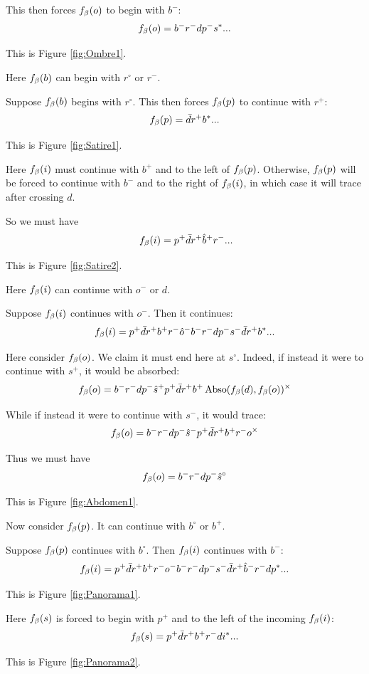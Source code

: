 This then forces $f_\beta(o)$ to begin with $b^-$:
\[
f_\beta(o) = b^- r^- d p^- s^*...
\]

This is Figure \ref{fig:Ombre1}.

Here $f_\beta(b)$ can begin with $r^\circ$ or $r^-$. 

 \label{Satire}
Suppose $f_\beta(b)$ begins with $r^\circ$. This then forces $f_\beta(p)$ to continue with $r^+$:
\[
f_\beta(p) = \bar{d} r^+ b^*...
\]

This is Figure \ref{fig:Satire1}.

Here $f_\beta(i)$ must continue with $b^+$ and to the left of $f_\beta(p)$. Otherwise, $f_\beta(p)$ will be forced to continue with $b^-$ and to the right of $f_\beta(i)$, in which case it will trace after crossing $d$.

So we must have
\[
\
f_\beta(i) = p^+ \bar{d} r^+ \hat{b}^+ r^-...
\]

This is Figure \ref{fig:Satire2}.

Here $f_\beta(i)$ can continue with $o^-$ or $d$.

 \label{Abdomen}
Suppose $f_\beta(i)$ continues with $o^-$. Then it continues:
\[
f_\beta(i) = p^+ \bar{d} r^+ b^+ r^- \hat{o}^- b^- r^- d p^- s^- \bar{d} r^+ b^*...
\]



Here consider $f_\beta(o)$. We claim it must end here at $s^\circ$. Indeed, if instead it were to continue with $s^+$, it would be absorbed:
\[
f_\beta(o) = b^- r^- d p^- \hat{s}^+ p^+ \bar{d} r^+ b^+ \operatorname{Abso}(f_\beta(d), f_\beta(o))^\times
\]

While if instead it were to continue with $s^-$, it would trace:
\[
f_\beta(o) = b^- r^- d p^- \hat{s}^- p^+ \bar{d} r^+ b^+ r^- o^\times
\]

Thus we must have
\[
f_\beta(o) = b^- r^- d p^- \hat{s}^\circ
\]

This is Figure \ref{fig:Abdomen1}.

Now consider $f_\beta(p)$. It can continue with $b^\circ$ or $b^+$.

\label{Panorama}
Suppose $f_\beta(p)$ continues with $b^\circ$. Then $f_\beta(i)$ continues with $b^-$:
\[
f_\beta(i) = p^+ \bar{d} r^+ b^+ r^- o^- b^- r^- d p^- s^- \bar{d} r^+ \hat{b}^- r^- d p^*...
\]

This is Figure \ref{fig:Panorama1}.

Here $f_\beta(s)$ is forced to begin with $p^+$ and to the left of the incoming $f_\beta(i)$:
\[
f_\beta(s) = p^+ \bar{d} r^+ b^+ r^- d i^*...
\]

This is Figure \ref{fig:Panorama2}.

